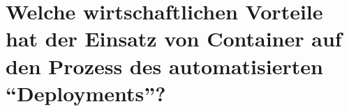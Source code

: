 \chapter{Welche wirtschaftlichen Vorteile hat der Einsatz von Container auf den Prozess des automatisierten \enquote{Deployments}?}